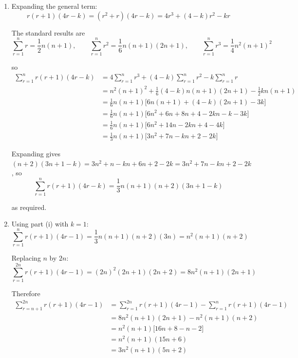 \documentclass[leqno]{article}
\begin{document}
\begin{enumerate}[
  label=\textbf{\arabic*.},
  leftmargin=*,
  topsep=0pt,
  partopsep=0pt,
  parsep=0pt
]
\vspace*{10pt}

\begin{djsSolution}
\begin{enumerate}[label=\textbf{(\roman*)}, start=1]
  \item Expanding the general term:
\[
r(r+1)(4r-k)=(r^2+r)(4r-k)=4r^3+(4-k)r^2-kr
\]

The standard results are
\[
\sum_{r=1}^{n} r=\frac12 n(n+1),\qquad \sum_{r=1}^{n} r^2=\frac16 n(n+1)(2n+1),\qquad \sum_{r=1}^{n} r^3=\frac14 n^2(n+1)^2
\]

so
\begin{align*}
\sum_{r=1}^{n} r(r+1)(4r-k)&=4\sum_{r=1}^{n} r^3+(4-k)\sum_{r=1}^{n} r^2-k\sum_{r=1}^{n} r\\
&=n^2(n+1)^2+\frac16(4-k)n(n+1)(2n+1)-\frac12 kn(n+1)\\
&=\frac16 n(n+1)\big[6n(n+1)+(4-k)(2n+1)-3k\big]\\
&=\frac16 n(n+1)\big[6n^2+6n+8n+4-2kn-k-3k\big]\\
&=\frac16 n(n+1)\big[6n^2+14n-2kn+4-4k\big]\\
&=\frac13 n(n+1)\big[3n^2+7n-kn+2-2k\big]
\end{align*}

Expanding gives \((n+2)(3n+1-k)=3n^2+n-kn+6n+2-2k=3n^2+7n-kn+2-2k\), so
\[
\sum_{r=1}^{n} r(r+1)(4r-k)=\dfrac13 n(n+1)(n+2)(3n+1-k)
\]

as required.

  \item Using part (i) with \(k=1\):
\[
\sum_{r=1}^{n} r(r+1)(4r-1)=\dfrac13 n(n+1)(n+2)(3n)=n^2(n+1)(n+2)
\]

Replacing \(n\) by \(2n\):
\[
\sum_{r=1}^{2n} r(r+1)(4r-1)=(2n)^2(2n+1)(2n+2)=8n^2(n+1)(2n+1)
\]

Therefore
\begin{align*}
\sum_{r=n+1}^{2n} r(r+1)(4r-1)&=\sum_{r=1}^{2n} r(r+1)(4r-1)-\sum_{r=1}^{n} r(r+1)(4r-1)\\
&=8n^2(n+1)(2n+1)-n^2(n+1)(n+2)\\
&=n^2(n+1)\big[16n+8-n-2\big]\\
&=n^2(n+1)(15n+6)\\
&=3n^2(n+1)(5n+2)
\end{align*}

\end{enumerate}
\end{djsSolution}

\newpage

\questionitem


\end{enumerate}
\end{document}
